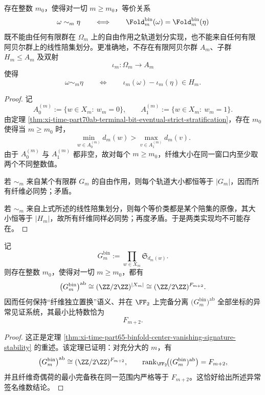 \begin{theorem}[大窗口上的全局非商化刚性]\label{thm:xi-time-part70d-global-nonquotient-rigidity}
存在整数 \(m_0\)，使得对一切 \(m\ge m_0\)，等价关系
\[
\omega\sim_m\eta
\qquad\Longleftrightarrow\qquad
\Fold_m^{\mathrm{bin}}(\omega)=\Fold_m^{\mathrm{bin}}(\eta)
\]
既不能由任何有限群在 \(\Omega_m\) 上的自由作用之轨道划分实现，也不能来自任何有限阿贝尔群上的线性陪集划分。更准确地，不存在有限阿贝尔群 \(A_m\)、子群 \(H_m\le A_m\) 及双射
\[
\iota_m:\Omega_m\longrightarrow A_m
\]
使得
\[
\omega\sim_m\eta
\qquad\Longleftrightarrow\qquad
\iota_m(\omega)-\iota_m(\eta)\in H_m.
\]
\end{theorem}
\begin{proof}
记
\[
A_0^{(m)}:=\{w\in X_m:\ w_m=0\},
\qquad
A_1^{(m)}:=\{w\in X_m:\ w_m=1\}.
\]
由定理 \ref{thm:xi-time-part70ab-terminal-bit-eventual-strict-stratification}，存在 \(m_0\) 使得当 \(m\ge m_0\) 时，
\[
\min_{w\in A_0^{(m)}}d_m(w)>\max_{v\in A_1^{(m)}}d_m(v).
\]
由于 \(A_0^{(m)}\) 与 \(A_1^{(m)}\) 都非空，故对每个 \(m\ge m_0\)，纤维大小在同一窗口内至少取两个不同整数值。

若 \(\sim_m\) 来自某个有限群 \(G_m\) 的自由作用，则每个轨道大小都恒等于 \(|G_m|\)，因而所有纤维必同势；矛盾。

若 \(\sim_m\) 来自上式所述的线性陪集划分，则每个等价类都是某个陪集的原像，其大小恒等于 \(|H_m|\)，故所有纤维同样必同势；再度矛盾。于是两类实现均不可能存在。
\end{proof}

\begin{theorem}[异常签名维数的渐近饱和]\label{thm:xi-time-part70d-anomaly-signature-saturation}
记
\[
G_m^{\mathrm{bin}}:=\prod_{w\in X_m}\mathfrak S_{d_m(w)}.
\]
则存在整数 \(m_0\)，使得对一切 \(m\ge m_0\)，都有
\[
\bigl(G_m^{\mathrm{bin}}\bigr)^{\mathrm{ab}}
\cong
(\ZZ/2\ZZ)^{|X_m|}
\cong
(\ZZ/2\ZZ)^{F_{m+2}}.
\]
因而任何保持“纤维独立置换”语义、并在 \(\FF_2\) 上完备分离 \(\bigl(G_m^{\mathrm{bin}}\bigr)^{\mathrm{ab}}\) 全部坐标的异常见证系统，其最小比特数恰为
\[
F_{m+2}.
\]
\end{theorem}
\begin{proof}
这正是定理 \ref{thm:xi-time-part65-binfold-center-vanishing-signature-stability} 的重述。该定理已证明：对充分大的 \(m\)，有
\[
\bigl(G_m^{\mathrm{bin}}\bigr)^{\mathrm{ab}}
\cong
(\ZZ/2\ZZ)^{F_{m+2}},
\qquad
\operatorname{rank}_{\FF_2}\!\bigl((G_m^{\mathrm{bin}})^{\mathrm{ab}}\bigr)=F_{m+2},
\]
并且纤维奇偶荷的最小完备秩在同一范围内严格等于 \(F_{m+2}\)。这恰好给出所述异常签名维数结论。
\end{proof}

